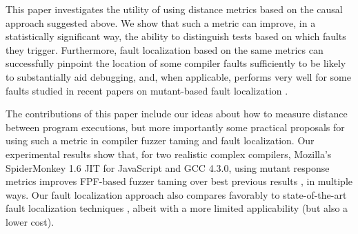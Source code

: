 This paper investigates the utility of using distance metrics based on the causal approach suggested above.  We show that such a metric can improve, in a statistically significant way, the ability to distinguish tests based on which faults they trigger.  Furthermore, fault localization based on the same metrics can successfully pinpoint the location of some compiler faults sufficiently to be likely to substantially aid debugging, and, when applicable, performs very well for some faults studied in recent papers on mutant-based fault localization \cite{multilingual,Papadakis}.


The contributions of this paper include our ideas about how to measure distance between program executions, but more importantly some practical proposals for using such a metric in compiler fuzzer taming and fault localization.  Our experimental results show that, for two realistic complex compilers, Mozilla's SpiderMonkey 1.6 JIT for JavaScript and GCC 4.3.0, using mutant response metrics improves FPF-based fuzzer taming over best previous results \cite{PLDI13}, in multiple ways.  Our fault localization approach also compares favorably to state-of-the-art fault localization techniques \cite{MUSE,multilingual,Metallaxis}, albeit with a more limited applicability (but also a lower cost).